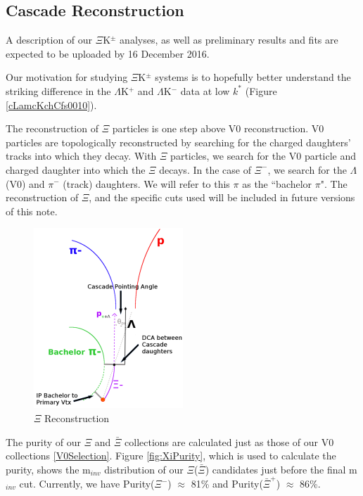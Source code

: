 \documentclass[../AnalysisNoteJBuxton.tex]{subfiles}
\begin{document}
\subsection{Cascade Reconstruction}
\label{CascadeReconstruction}

A description of our $\Xi$K$^{\pm}$ analyses, as well as preliminary results and fits are expected to be uploaded by 16 December 2016.

Our motivation for studying $\Xi$K$^{\pm}$ systems is to hopefully better understand the striking difference in the $\Lambda$K$^{+}$ and $\Lambda$K$^{-}$ data at low $k^{*}$ (Figure \ref{cLamcKchCfs0010}).

The reconstruction of $\Xi$ particles is one step above V0 reconstruction.  V0 particles are topologically reconstructed by searching for the charged daughters' tracks into which they decay.  With $\Xi$ particles, we search for the V0 particle and charged daughter into which the $\Xi$ decays.  In the case of $\Xi^{-}$, we search for the $\Lambda$ (V0) and $\pi^{-}$ (track) daughters.  We will refer to this $\pi$ as the ``bachelor $\pi$".  The reconstruction of $\Xi$, and the specific cuts used will be included in future versions of this note.

\begin{figure}[h]
  \centering
  \includegraphics[width=0.5\textwidth]{3_DataSelection/Figures/XiCuts.pdf}
  \caption[$\Xi$ Reconstruction]{$\Xi$ Reconstruction}
  \label{fig:XiReconstruction}
\end{figure}

The purity of our $\Xi$ and $\bar{\Xi}$ collections are calculated just as those of our V0 collections \ref{V0Selection}.
Figure \ref{fig:XiPurity}, which is used to calculate the purity, shows the m$_{inv}$ distribution of our $\Xi$($\bar{\Xi}$) candidates just before the final m$_{inv}$ cut.  Currently, we have Purity($\Xi^{-}$) $\approx$ 81\% and Purity($\bar{\Xi}^{+}$) $\approx$ 86\%.
\end{document}
